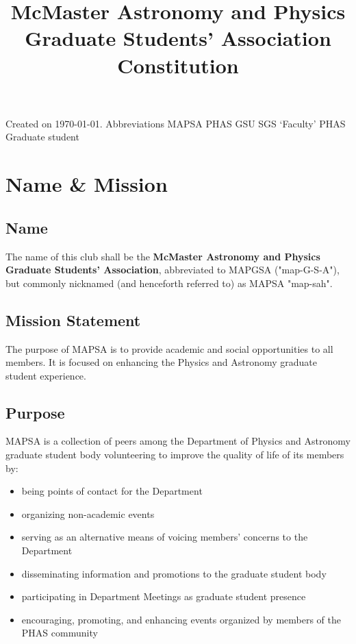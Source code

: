 \documentclass[onecolumn,aps,prd]{revtex4-2}
\begin{document}
		
\title{{McMaster Astronomy and Physics Graduate Students' Association}\\\huge{Constitution}}
\maketitle
Created on \today.
\tableofcontents
Abbreviations
MAPSA
PHAS
GSU
SGS
`Faculty'
PHAS Graduate student
\section{Name \& Mission}
\subsection{Name}The name of this club shall be the \textbf{McMaster Astronomy and Physics Graduate Students' Association}, abbreviated to MAPGSA ("map-G-S-A"), but commonly nicknamed (and henceforth referred to) as MAPSA "map-sah".
\subsection{Mission Statement}
The purpose of MAPSA is to provide academic and social opportunities to all members. It is focused on enhancing
the Physics and Astronomy graduate student experience.
\subsection{Purpose}
MAPSA is a collection of peers among the Department of Physics and Astronomy graduate student body volunteering to improve the quality of life of its members by: 
\begin{itemize}
	\item being points of contact for the Department
	\item organizing non-academic events 
	\item serving as an alternative means of voicing members' concerns to the Department
	\item disseminating information and promotions to the graduate student body
	\item participating in Department Meetings as graduate student presence
	\item encouraging, promoting, and enhancing events organized by members of the PHAS community
\end{itemize}
\end{document}

